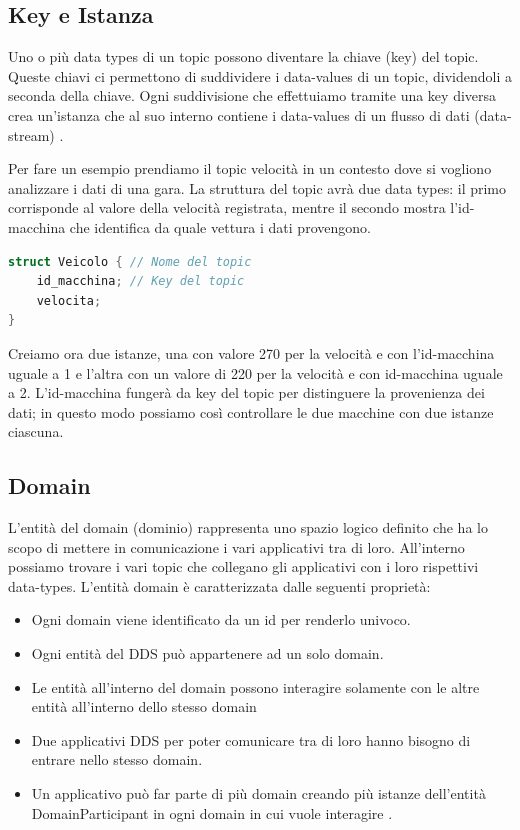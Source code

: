 \subsection{Key e Istanza}
Uno o più data types di un topic possono diventare la chiave (key) del topic. 
Queste chiavi ci permettono di suddividere
i data-values di un topic, dividendoli a seconda della chiave.
Ogni suddivisione che effettuiamo tramite una key diversa crea 
un'istanza che al suo interno contiene i data-values di un 
flusso di dati (data-stream)
\cite{Instance81:online}.

Per fare un esempio prendiamo il topic velocità in un contesto dove si
vogliono analizzare i dati di una gara.
La struttura del topic avrà due data types: il primo corrisponde al valore
della velocità registrata, mentre il secondo mostra l'id-macchina 
che identifica da quale vettura i dati provengono.

\vspace{5mm} %
\begin{lstlisting}[language=C++, caption=Esempio di Topic con una key
    usando il linguaggio IDL.
    , label=topic struct,
    captionpos=b]
struct Veicolo { // Nome del topic
    id_macchina; // Key del topic
    velocita;
}
\end{lstlisting}
\vspace{5mm}

Creiamo ora due istanze, una con valore 270 per la velocità e con 
l'id-macchina uguale a 1 e l'altra con un valore di 220 per la velocità e 
con id-macchina 
uguale a 2. L'id-macchina fungerà da key 
del topic per distinguere la provenienza dei dati; in questo
modo possiamo così controllare le due macchine con due istanze ciascuna.
\
\label{Key e Istanza}

\subsection{Domain}
L'entità del domain (dominio) rappresenta uno spazio logico definito che
ha lo scopo di mettere in comunicazione i vari applicativi tra di loro.
All'interno possiamo trovare i vari topic che collegano gli applicativi
con i loro rispettivi data-types.
L'entità domain è caratterizzata dalle seguenti proprietà:
\begin{itemize}
    \item Ogni domain viene identificato da un id 
    per renderlo univoco.
    \item Ogni entità del DDS può appartenere
    ad un solo domain.
    \item Le entità all'interno del domain possono interagire
    solamente con le altre entità all'interno dello stesso domain
    \item Due applicativi DDS per poter comunicare tra di loro
    hanno bisogno di entrare nello stesso domain.
    \item Un applicativo può far parte di più domain creando 
    più istanze dell'entità DomainParticipant in ogni
    domain in cui vuole interagire \cite{domainrti}.
\end{itemize}

